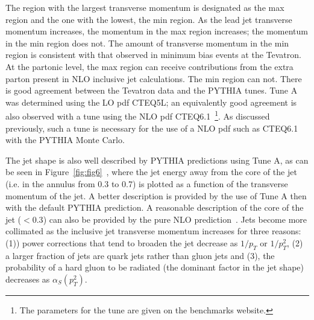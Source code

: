 \documentclass[12pt]{iopart}
\def\as{\alpha_S}
\begin{document}

The region with the largest transverse momentum is designated as the max region and the one with the lowest, the  min region. As the
lead jet transverse momentum increases, the momentum in the max region increases;  the momentum in the min region does not. The amount
of transverse momentum in the min region is  consistent with that observed in minimum bias events at the Tevatron. At the partonic
level,  the max region  can receive contributions from the extra parton  present in NLO inclusive jet  calculations. The min region can
not. There is good agreement between the Tevatron data  and the PYTHIA tunes. Tune A was determined using the LO pdf CTEQ5L; an
equivalently good agreement is also observed with a tune using the NLO pdf CTEQ6.1~\footnote{
The parameters for the tune are given on the benchmarks website.}.
As discussed previously, such a tune is necessary for the use of a NLO pdf such as CTEQ6.1 with the PYTHIA Monte Carlo. 

The jet shape is also well described by PYTHIA predictions using Tune A, as can be seen in
Figure~\ref{fig:fig6}~\cite{Acosta:2005ix}, where the jet energy away from the core of the jet (i.e. in the annulus
from 0.3 to 0.7) is plotted as a function of the transverse momentum of the jet. A better description is provided by
the use of Tune A then with the default PYTHIA prediction.  A reasonable description of the core of the jet ($<
0.3$) can also be provided by the pure NLO prediction~\cite{Ellis:1992qq}. Jets become more collimated as
the inclusive jet transverse momentum increases for three reasons: (1)) power corrections that tend to broaden the
jet decrease as $1/p_T$ or $1/p_T^2$, (2) a larger fraction of jets are quark jets rather than gluon jets and (3),
the probability of a hard gluon to be radiated (the dominant factor in the jet shape) decreases as $\as(p_T^2)$. 
\end{document}
